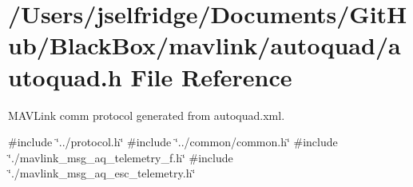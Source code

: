 \section{/\+Users/jselfridge/\+Documents/\+Git\+Hub/\+Black\+Box/mavlink/autoquad/autoquad.h File Reference}
\label{autoquad_8h}


M\+A\+V\+Link comm protocol generated from autoquad.\+xml.  


{\ttfamily \#include \char`\"{}../protocol.\+h\char`\"{}}\newline
{\ttfamily \#include \char`\"{}../common/common.\+h\char`\"{}}\newline
{\ttfamily \#include \char`\"{}./mavlink\+\_\+msg\+\_\+aq\+\_\+telemetry\+\_\+f.\+h\char`\"{}}\newline
{\ttfamily \#include \char`\"{}./mavlink\+\_\+msg\+\_\+aq\+\_\+esc\+\_\+telemetry.\+h\char`\"{}}\newline
